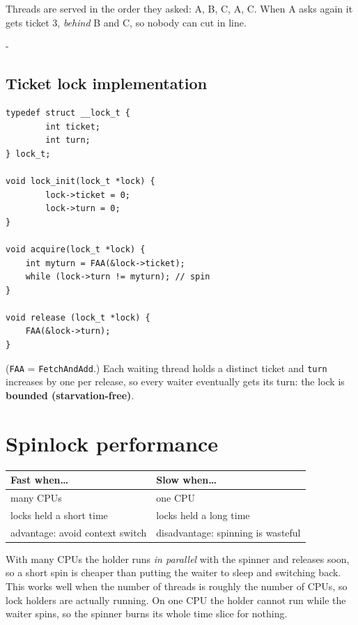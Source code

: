 \documentclass[11pt,a4paper]{article}
\makeatletter
\newcommand{\keepspace}[1]{\par\penalty-100\begingroup
  \setlength{\dimen@}{#1}\dimen@ii\pagegoal\advance\dimen@ii-\pagetotal
  \ifdim\dimen@>\dimen@ii\ifdim\dimen@ii>\z@\vfil\fi\break\fi\endgroup}
\makeatother
\begin{document}
Threads are served in the order they asked: A, B, C, A, C. When A asks again
it gets ticket 3, \emph{behind} B and C, so nobody can cut in line.

\keepspace{24\baselineskip}
\subsection{Ticket lock implementation}

\begin{lstlisting}
typedef struct __lock_t {
        int ticket;
        int turn;
} lock_t;

void lock_init(lock_t *lock) {
        lock->ticket = 0;
        lock->turn = 0;
}

void acquire(lock_t *lock) {
    int myturn = FAA(&lock->ticket);
    while (lock->turn != myturn); // spin
}

void release (lock_t *lock) {
    FAA(&lock->turn);
}
\end{lstlisting}

(\texttt{FAA} = \texttt{FetchAndAdd}.) Each waiting thread holds a distinct
ticket and \texttt{turn} increases by one per release, so every waiter
eventually gets its turn: the lock is \textbf{bounded (starvation-free)}.

\section{Spinlock performance}

\begin{center}
\renewcommand{\arraystretch}{1.2}
\begin{tabularx}{\textwidth}{@{}XX@{}}
  \toprule
  \textbf{Fast when\ldots} & \textbf{Slow when\ldots} \\
  \midrule
  many CPUs & one CPU \\
  locks held a short time & locks held a long time \\
  advantage: avoid context switch & disadvantage: spinning is wasteful \\
  \bottomrule
\end{tabularx}
\end{center}

With many CPUs the holder runs \emph{in parallel} with the spinner and
releases soon, so a short spin is cheaper than putting the waiter to sleep
and switching back. This works well when the number of threads is roughly
the number of CPUs, so lock holders are actually running. On one CPU the holder cannot run while the waiter spins,
so the spinner burns its whole time slice for nothing.
\end{document}
